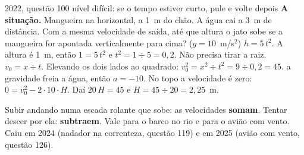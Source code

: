 \begin{enemreal}{2022, questão 100 \hfill\normalfont nível difícil: se o tempo estiver curto, pule e volte depois}
\textbf{A situação.} Mangueira na horizontal, a 1~m do chão. A água cai a 3~m de distância. Com a mesma velocidade de saída,
até que altura o jato sobe se a mangueira for apontada verticalmente para cima? ($g = 10$~m/s$^2$)
 $h = 5\,t^2$. A altura é 1~m, então $1 = 5\,t^2$ e $t^2 = 1 \div 5 = 0{,}2$. Não precisa tirar a raiz.
 $v_0 = x \div t$. Elevando os dois lados ao quadrado: $v_0^2 = x^2 \div t^2 = 9 \div 0{,}2 = 45$.
 a gravidade freia a água, então $a = -10$. No topo a velocidade é zero:
$0 = v_0^2 - 2 \cdot 10 \cdot H$. Daí $20\,H = 45$ e $H = 45 \div 20 = 2{,}25$~m.
\end{enemreal}

\begin{minipage}[c]{0.40\linewidth}\centering
{}
\end{minipage}\hfill
\begin{minipage}[c]{0.57\linewidth}
\begin{macete}
Subir andando numa escada rolante que sobe: as velocidades \textbf{somam}. Tentar descer por ela: \textbf{subtraem}.
Vale para o barco no rio e para o avião com vento.
Caiu em 2024 (nadador na correnteza, questão 119) e em 2025 (avião com vento, questão 126).
\end{macete}
\end{minipage}

